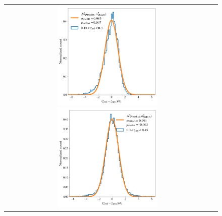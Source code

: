 \documentclass[fleqn,usenatbib,useAMS]{mnras}
\begin{document}
\begin{figure}
 
 \begin{tabular}{cc}
\includegraphics[width=0.5\textwidth]{figures_tmp/nz_normal_1.png}
\includegraphics[width=0.5\textwidth]{figures_tmp/nz_normal_2.png}
\end{tabular}


\end{figure}
\end{document}
